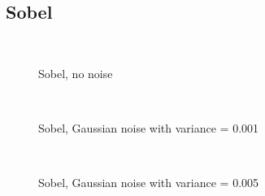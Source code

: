 \documentclass[10pt,a4paper]{article}
\begin{document}
\subsection{Sobel}
\begin{figure}
  \centering
     \\
  \caption{Sobel, no noise}
  \label{fig:sobel_no_noise}
\end{figure}

\begin{figure}
  \centering
     \\
  \caption{Sobel, Gaussian noise with variance = 0.001}
  \label{fig:sobel_001}
\end{figure}

\begin{figure}
  \centering
     \\
  \caption{Sobel, Gaussian noise with variance = 0.005}
  \label{fig:sobel_005}
\end{figure}
\end{document}
